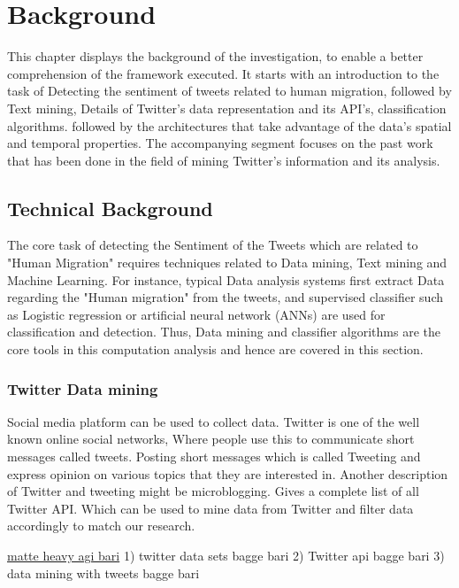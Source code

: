 \chapter{Background}\label{chap:background}
This chapter displays the background of the investigation, to enable a better comprehension of the framework executed. It starts with an introduction to the task of Detecting the sentiment of tweets related to human migration, followed by Text mining, Details of Twitter's data representation and its API's, classification algorithms. followed by the architectures that take advantage of the data’s spatial and temporal properties. The accompanying segment focuses on the past work that has been done in the field of mining Twitter's information and its analysis.


    
\section{Technical Background}

The core task of detecting the Sentiment of the Tweets which are related to "Human Migration" requires techniques related to Data mining, Text mining and Machine Learning. For instance, typical Data analysis systems first extract Data regarding the "Human migration" from the tweets, and supervised classifier such as Logistic regression or artificial neural network (ANNs) are used for classification and detection. Thus, Data mining and classifier algorithms are the core tools in this computation analysis and hence are covered in this section.

\subsection{Twitter Data mining}

Social media platform can be used to collect data. Twitter is one of the well known online social networks, Where people use this to communicate short messages called tweets. Posting short messages which is called Tweeting and express opinion on various topics that they are interested in. Another description of Twitter and tweeting might be microblogging. \cite{TwitterDevDocs} Gives a
complete list of all Twitter API. Which can be used to mine data from Twitter and filter data
accordingly to match our research. 

\underline{matte heavy agi bari}
1) twitter data sets bagge bari
2) Twitter api bagge bari
3) data mining with tweets bagge bari


